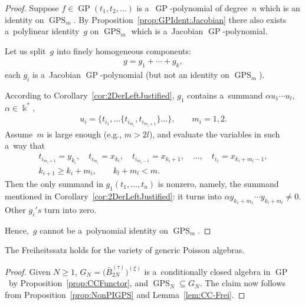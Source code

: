 \begin{proof}
Suppose $f \in \operatorname{GP}(t_1,t_2,\dots)$ is a~$\operatorname{GP}$-polynomial of degree~$n$ which is an identity on $\operatorname{GPS}_{m}$.
By Proposition~\ref{prop:GPIdent:Jacobian} there also exists a~polylinear identity~$g$ on $\operatorname{GPS}_{m}$ which is a~Jacobian
$\operatorname{GP}$-polynomial.

Let us split~$g$ into f\/inely homogeneous components:
\begin{gather*}
g = g_1 + \cdots + g_k,
\end{gather*}
each $g_i$ is a~Jacobian $\operatorname{GP}$-polynomial (but not an identity on $\operatorname{GPS}_{m}$).

According to Corollary~\ref{cor:2DerLeftJustified}, $g_1$ contains a~summand $\alpha u_1\cdots u_l$, $\alpha \in
\Bbbk^*$,
\begin{gather*}
u_i = \{t_{i_1}, \dots \{t_{i_{m_i}}, t_{i_{m_i+1}} \}\dots \},
\qquad
m_i=1,2.
\end{gather*}
Assume~$m$ is large enough (e.g., $m>2 l$), and evaluate the variables in such a~way that
\begin{gather*}
t_{i_{m_i+1}} = y_{k_i},
\quad
t_{i_{m_i}}=x_{k_i},
\quad
t_{i_{m_i-1}}=x_{k_i+1},\quad \dots,\quad  t_{i_1}=x_{k_i+m_i-1},
\\
k_{i+1}\ge k_i+m_i,
\qquad
k_l+m_l<m.
\end{gather*}
Then the only summand in $g_1(t_1,\dots, t_n) $ is nonzero, namely, the summand mentioned in
Corollary~\ref{cor:2DerLeftJustified}: it turns into $\alpha y_{k_1+m_1}\cdots y_{k_l+m_l} \ne 0$.
Other $g_i's$ turn into zero.

Hence,~$g$ cannot be a~polynomial identity on $\operatorname{GPS}_{m}$.
\end{proof}

\begin{theorem}
The Freiheitssatz holds for the variety of generic Poisson algebras.
\end{theorem}

\begin{proof}
Given $N\ge 1$, $G_N = \big(\bar B_{2N}^{(\tau)}\big)^{(\xi)}$ is a~conditionally closed algebra in $\operatorname{GP}$~by
Proposition~\ref{prop:CCFunctor}, and $\operatorname{GPS}_N\subseteq G_N$.
The claim now follows from Proposition~\ref{prop:NonPIGPS} and Lemma~\ref{lem:CC-Frei}.
\end{proof}
